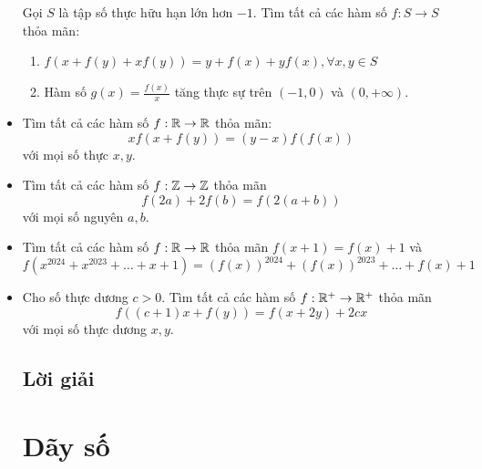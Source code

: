 \documentclass[11pt]{scrartcl}
\begin{document}
\begin{itemize}[label=, leftmargin=0em, itemsep=-0em]
\begin{btvn}
        Gọi $S$ là tập số thực hữu hạn lớn hơn $-1$. Tìm tất cả các hàm số $f: S \to S$ thỏa mãn:
        \begin{enumerate}
            \item $f(x + f(y) + xf(y)) = y + f(x) +yf(x), \forall x,y \in S$
            \item Hàm số $g(x) = \frac{f(x)}{x}$ tăng thực sự trên $(-1,0)$ và $(0, +\infty)$.
        \end{enumerate}
    \end{btvn}
    \item \begin{btvn}
        Tìm tất cả các hàm số $f : \mathbb{R} \to \mathbb{R}$ thỏa mãn:
        \[
            xf(x + f(y)) = (y - x)f(f(x))
        \]
        với mọi số thực $x,y$.
    \end{btvn}
    \item \begin{btvn}
        Tìm tất cả các hàm số $f: \mathbb{Z} \to \mathbb{Z}$ thỏa mãn
        \[
            f(2a) + 2f(b) = f(2(a + b))
        \]
        với mọi số nguyên $a,b$.
    \end{btvn}
    \item \begin{btvn}
        Tìm tất cả các hàm số $f: \mathbb{R} \to \mathbb{R}$ thỏa mãn $f(x + 1) =f(x) + 1$ và
        \[
            f(x^{2024} + x^{2023} + \dots + x + 1) = (f(x))^{2024} + (f(x))^{2023} + \dots + f(x) + 1
        \]
    \end{btvn}
    \item \begin{btvn}
        Cho số thực dương $c > 0$. Tìm tất cả các hàm số $f: \mathbb{R}^+ \to \mathbb{R}^+$ thỏa mãn
        \[
            f((c + 1)x +f(y)) = f(x + 2y) +2cx
        \]
        với mọi số thực dương $x,y$.
    \end{btvn}
    \subsection{\LARGE \textcolor{dk}{Lời giải}}
    \newpage
    \thispagestyle{plain}
    
    \section{\huge Dãy số}

\end{itemize}
\end{document}
